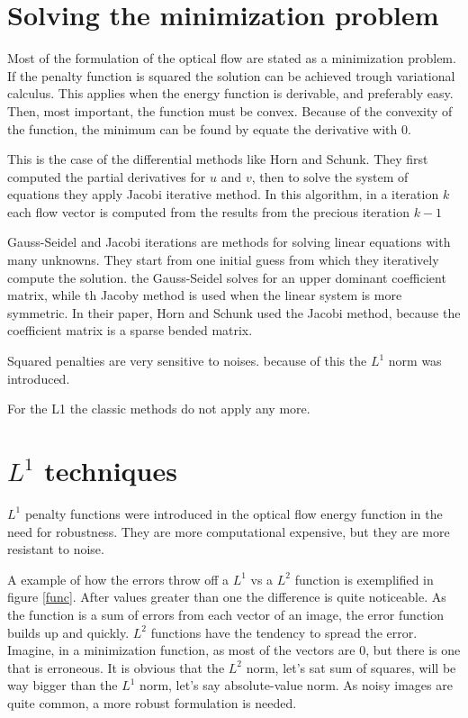 \documentclass[12pt,a4paper,twoside]{report}
\begin{document}
\section{Solving the minimization problem}
Most of the formulation of the optical flow are stated as a minimization problem. If the penalty function is squared the solution can be achieved trough variational calculus. This applies when the energy function is derivable, and preferably easy. Then, most important, the function must be convex. Because of the convexity of the function, the minimum can be found by equate the derivative with 0. 

This is the case of the differential methods like Horn and Schunk. They first computed the partial derivatives for $u$ and $v$, then to solve the system of equations they apply Jacobi iterative method. In this algorithm, in a iteration $k$ each flow vector is computed from the results from the precious iteration $k-1$

Gauss-Seidel and Jacobi iterations are methods for solving linear equations with many unknowns. They start from one initial guess from which they iteratively compute the solution. the Gauss-Seidel solves for an upper dominant coefficient matrix, while th Jacoby method is used when the linear system is more symmetric. In their paper, Horn and Schunk used the Jacobi method, because the coefficient matrix is a sparse bended matrix.

Squared penalties are very sensitive to noises. because of this the $L^1$ norm was introduced.

For the L1 the classic methods do not apply  any more.


\section{$L^1$ techniques}

$L^1$ penalty functions were introduced in the optical flow energy function in the need for robustness. They are more computational expensive, but they are more resistant to noise.

 A example of how the errors throw off a $L^1$ vs a $L^2$ function is exemplified in figure \ref{func}. After values greater than one the difference is quite noticeable. As the function is a sum of errors from each vector of an image, the error function builds up and quickly. $L^2$ functions have the tendency to spread the error. Imagine, in a minimization function, as most of the vectors are $0$, but there is one that is erroneous. It is obvious that the $L^2$ norm, let's sat sum of squares, will be way bigger than the $L^1$ norm, let's say absolute-value norm. As noisy images are quite common, a more robust formulation is needed.
 
\end{document}
